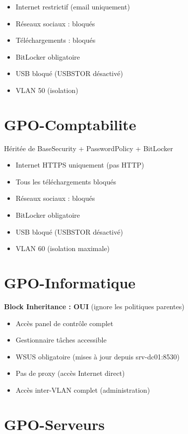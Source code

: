 \begin{itemize}
    \item Internet restrictif (email uniquement)
    \item Réseaux sociaux : bloqués
    \item Téléchargements : bloqués
    \item BitLocker obligatoire
    \item USB bloqué (USBSTOR désactivé)
    \item VLAN 50 (isolation)
\end{itemize}

\section{GPO-Comptabilite}

Héritée de BaseSecurity + PasswordPolicy + BitLocker

\begin{itemize}
    \item Internet HTTPS uniquement (pas HTTP)
    \item Tous les téléchargements bloqués
    \item Réseaux sociaux : bloqués
    \item BitLocker obligatoire
    \item USB bloqué (USBSTOR désactivé)
    \item VLAN 60 (isolation maximale)
\end{itemize}

\section{GPO-Informatique}

\textbf{Block Inheritance : OUI} (ignore les politiques parentes)

\begin{itemize}
    \item Accès panel de contrôle complet
    \item Gestionnaire tâches accessible
    \item WSUS obligatoire (mises à jour depuis srv-dc01:8530)
    \item Pas de proxy (accès Internet direct)
    \item Accès inter-VLAN complet (administration)
\end{itemize}

\section{GPO-Serveurs}

